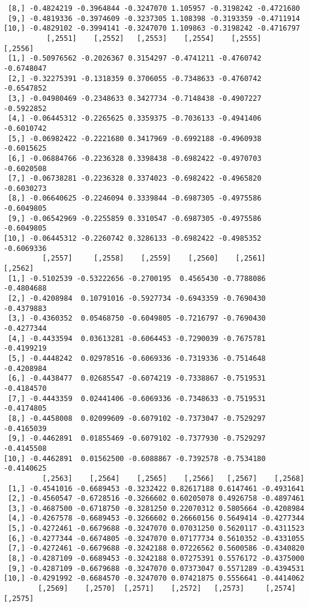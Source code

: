 \documentclass[
  letterpaper,
  DIV=11,
  numbers=noendperiod]{scrreprt}
\begin{document}
\begin{verbatim}
 [8,] -0.4824219 -0.3964844 -0.3247070 1.105957 -0.3198242 -0.4721680
 [9,] -0.4819336 -0.3974609 -0.3237305 1.108398 -0.3193359 -0.4711914
[10,] -0.4829102 -0.3994141 -0.3247070 1.109863 -0.3198242 -0.4716797
          [,2551]    [,2552]   [,2553]    [,2554]    [,2555]    [,2556]
 [1,] -0.50976562 -0.2026367 0.3154297 -0.4741211 -0.4760742 -0.6748047
 [2,] -0.32275391 -0.1318359 0.3706055 -0.7348633 -0.4760742 -0.6547852
 [3,] -0.04980469 -0.2348633 0.3427734 -0.7148438 -0.4907227 -0.5922852
 [4,] -0.06445312 -0.2265625 0.3359375 -0.7036133 -0.4941406 -0.6010742
 [5,] -0.06982422 -0.2221680 0.3417969 -0.6992188 -0.4960938 -0.6015625
 [6,] -0.06884766 -0.2236328 0.3398438 -0.6982422 -0.4970703 -0.6020508
 [7,] -0.06738281 -0.2236328 0.3374023 -0.6982422 -0.4965820 -0.6030273
 [8,] -0.06640625 -0.2246094 0.3339844 -0.6987305 -0.4975586 -0.6049805
 [9,] -0.06542969 -0.2255859 0.3310547 -0.6987305 -0.4975586 -0.6049805
[10,] -0.06445312 -0.2260742 0.3286133 -0.6982422 -0.4985352 -0.6069336
         [,2557]     [,2558]    [,2559]    [,2560]    [,2561]    [,2562]
 [1,] -0.5102539 -0.53222656 -0.2700195  0.4565430 -0.7788086 -0.4804688
 [2,] -0.4208984  0.10791016 -0.5927734 -0.6943359 -0.7690430 -0.4379883
 [3,] -0.4360352  0.05468750 -0.6049805 -0.7216797 -0.7690430 -0.4277344
 [4,] -0.4433594  0.03613281 -0.6064453 -0.7290039 -0.7675781 -0.4199219
 [5,] -0.4448242  0.02978516 -0.6069336 -0.7319336 -0.7514648 -0.4208984
 [6,] -0.4438477  0.02685547 -0.6074219 -0.7338867 -0.7519531 -0.4184570
 [7,] -0.4443359  0.02441406 -0.6069336 -0.7348633 -0.7519531 -0.4174805
 [8,] -0.4458008  0.02099609 -0.6079102 -0.7373047 -0.7529297 -0.4165039
 [9,] -0.4462891  0.01855469 -0.6079102 -0.7377930 -0.7529297 -0.4145508
[10,] -0.4462891  0.01562500 -0.6088867 -0.7392578 -0.7534180 -0.4140625
         [,2563]    [,2564]    [,2565]    [,2566]   [,2567]    [,2568]
 [1,] -0.4541016 -0.6689453 -0.3232422 0.82617188 0.6147461 -0.4931641
 [2,] -0.4560547 -0.6728516 -0.3266602 0.60205078 0.4926758 -0.4897461
 [3,] -0.4687500 -0.6718750 -0.3281250 0.22070312 0.5805664 -0.4208984
 [4,] -0.4267578 -0.6689453 -0.3266602 0.26660156 0.5649414 -0.4277344
 [5,] -0.4272461 -0.6679688 -0.3247070 0.07031250 0.5620117 -0.4311523
 [6,] -0.4277344 -0.6674805 -0.3247070 0.07177734 0.5610352 -0.4331055
 [7,] -0.4272461 -0.6679688 -0.3242188 0.07226562 0.5600586 -0.4340820
 [8,] -0.4287109 -0.6689453 -0.3242188 0.07275391 0.5576172 -0.4375000
 [9,] -0.4287109 -0.6679688 -0.3247070 0.07373047 0.5571289 -0.4394531
[10,] -0.4291992 -0.6684570 -0.3247070 0.07421875 0.5556641 -0.4414062
        [,2569]    [,2570]  [,2571]    [,2572]   [,2573]     [,2574]    [,2575]

\end{verbatim}
\end{document}
